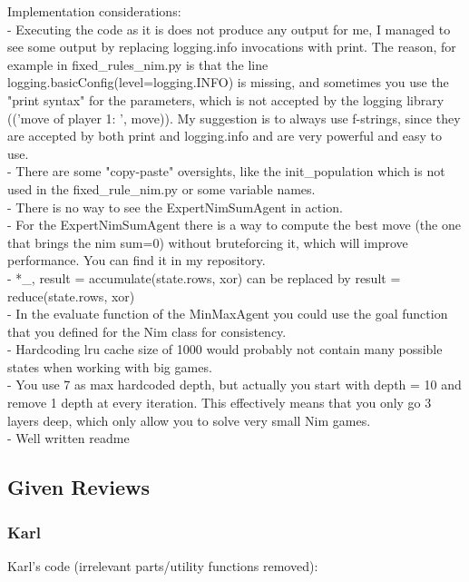 \begin{tcolorbox}[colback=green!5!white,colframe=green!75!black,code={\singlespacing}]
Implementation considerations: \\
- Executing the code as it is does not produce any output for me, I managed to see some output by replacing logging.info invocations with print. The reason, for example in fixed\_rules\_nim.py is that the line logging.basicConfig(level=logging.INFO) is missing, and sometimes you use the "print syntax" for the parameters, which is not accepted by the logging library (('move of player 1: ', move)). My suggestion is to always use f-strings, since they are accepted by both print and logging.info and are very powerful and easy to use. \\
- There are some "copy-paste" oversights, like the init\_population which is not used in the fixed\_rule\_nim.py or some variable names. \\
- There is no way to see the ExpertNimSumAgent in action. \\
- For the ExpertNimSumAgent there is a way to compute the best move (the one that brings the nim sum=0) without bruteforcing it, which will improve performance. You can find it in my repository. \\
- *\_, result = accumulate(state.rows, xor) can be replaced by result = reduce(state.rows, xor) \\
- In the evaluate function of the MinMaxAgent you could use the goal function that you defined for the Nim class for consistency. \\
- Hardcoding lru cache size of 1000 would probably not contain many possible states when working with big games. \\
- You use 7 as max hardcoded depth, but actually you start with depth = 10 and remove 1 depth at every iteration. This effectively means that you only go 3 layers deep, which only allow you to solve very small Nim games. \\
- Well written readme
\end{tcolorbox}


\subsection{Given Reviews}

\subsubsection{Karl}

Karl's code (irrelevant parts/utility functions removed):

